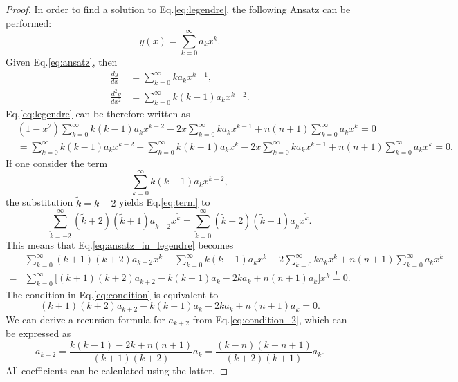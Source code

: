 \begin{proof}
    In order to find a solution to Eq.\eqref{eq:legendre}, the following Ansatz can be performed:
    \begin{equation}\label{eq:ansatz}
    y(x) = \sum_{k=0}^\infty a_k x^k.
    \end{equation}
    Given Eq.\eqref{eq:ansatz}, then
    \begin{align*}
    \frac{dy}{dx} &= \sum_{k=0}^\infty k a_k x^{k-1}, \\
    \frac{d^2y}{dx^2} &= \sum_{k=0}^\infty k (k-1) a_k x^{k-2}.
    \end{align*}
    Eq.\eqref{eq:legendre} can be therefore written as
    \begin{align}
    &(1-x^2)\sum_{k=0}^\infty k (k-1) a_k x^{k-2} - 2x\sum_{k=0}^\infty k a_k x^{k-1} + n(n+1)\sum_{k=0}^\infty a_k x^k=0 \label{eq:ansatz_in_legendre} \\
    &=\sum_{k=0}^\infty k (k-1) a_k x^{k-2} - \sum_{k=0}^\infty k (k-1) a_k x^{k} - 2x\sum_{k=0}^\infty k a_k x^{k-1} + n(n+1)\sum_{k=0}^\infty a_k x^k=0. \nonumber
    \end{align}
    If one consider the term
    \begin{equation}\label{eq:term}
    \sum_{k=0}^\infty k (k-1) a_k x^{k-2},
    \end{equation}
    the substitution $\tilde{k}=k-2$ yields Eq.\eqref{eq:term} to
    \begin{equation*}
    \sum_{\tilde{k}=-2}^\infty (\tilde{k}+2) (\tilde{k}+1) a_{\tilde{k}+2} x^{\tilde{k}}=\sum_{\tilde{k}=0}^\infty (\tilde{k}+2) (\tilde{k}+1) a_{\tilde{k}} x^{\tilde{k}}.
    \end{equation*}
    This means that Eq.\eqref{eq:ansatz_in_legendre} becomes
    \begin{align}
    &\sum_{k=0}^\infty (k+1)(k+2) a_{k+2} x^{k} - \sum_{k=0}^\infty k (k-1) a_k x^{k} - 2\sum_{k=0}^\infty k a_k x^k + n(n+1)\sum_{k=0}^\infty a_k x^k \nonumber \\
    = &\sum_{k=0}^\infty \big[ (k+1)(k+2) a_{k+2} - k (k-1) a_k - 2 k a_k + n(n+1) a_k \big] x^k \stackrel{!}{=} 0. \label{eq:condition}
    \end{align}
    The condition in Eq.\eqref{eq:condition} is equivalent to 
    \begin{equation}\label{eq:condition_2}
    (k+1)(k+2) a_{k+2} - k (k-1) a_k - 2 k a_k + n(n+1) a_k = 0.
    \end{equation}
    We can derive a recursion formula for $a_{k+2}$ from Eq.\eqref{eq:condition_2}, which can be expressed as
    \begin{equation}\label{eq:recursion}
    a_{k+2}= \frac{k (k-1) - 2 k + n(n+1)}{(k+1)(k+2)}a_k = \frac{(k-n)(k+n+1)}{(k+2)(k+1)}a_k.
    \end{equation}
    All coefficients can be calculated using the latter. 
    

\end{proof}

